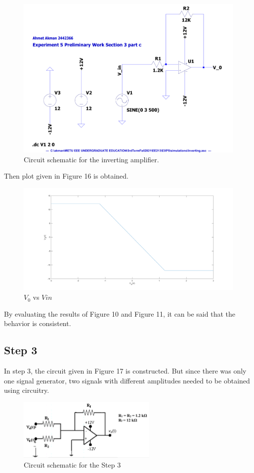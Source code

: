 \documentclass[letterpaper,12pt]{article}
\begin{document}
\begin{figure}[H]
	\centering
   \includegraphics[width=1\textwidth]{Inverting_SCH.pdf}
   \caption{Circuit schematic for the inverting amplifier.}
\end{figure} 
Then plot given in Figure  16 is obtained.

\begin{figure}[H]
	\centering
   \includegraphics[width=1\textwidth]{3c_vs_vin.png}
   \caption{\(V_0\) vs \(V{in}\)}
\end{figure}
By evaluating the results of Figure 10 and Figure 11, it can be said that the behavior is consistent.
\subsection{Step 3}
In step 3, the circuit given in Figure 17 is constructed. But since there was only one signal generator, two signals with different amplitudes needed to be obtained using circuitry.
\begin{figure}[H]
	\centering
   \includegraphics[width=0.6\textwidth]{circuit5.png}
   \caption{Circuit schematic for the Step 3}
\end{figure} 
\end{document}
